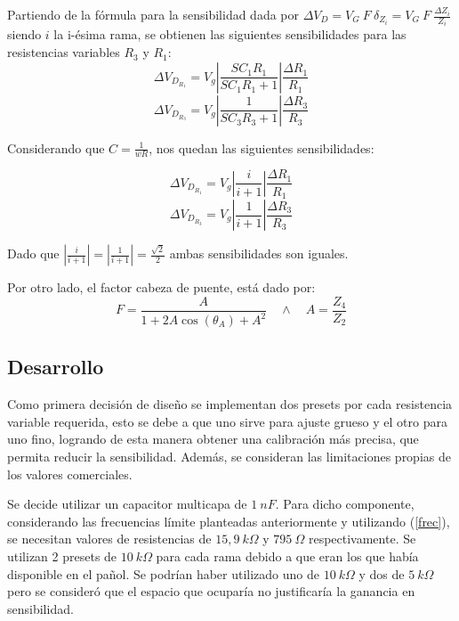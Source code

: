 Partiendo de la fórmula para la sensibilidad dada por $\Delta V_D=V_G \ F \ \delta_{Z_i}=V_G \ F \ \frac{\Delta Z_i}{Z_i}$ siendo $i$ la i-ésima rama, se obtienen las siguientes sensibilidades para las resistencias variables $R_3$ y $R_1$:
\begin{equation}
\Delta V_{D_{R_1}}=V_g\left|\frac{SC_1R_1}{SC_1R_1+1}\right|\frac{\Delta R_1}{R_1}
\end{equation}
\begin{equation}
\Delta V_{D_{R_3}}=V_g\left|\frac{1}{SC_3R_3+1}\right|\frac{\Delta R_3}{R_3}
\end{equation}

Considerando que $C=\frac{1}{wR}$, nos quedan las siguientes sensibilidades:

\begin{equation}
\Delta V_{D_{R_1}}=V_g\left|\frac{i}{i+1}\right|\frac{\Delta R_1}{R_1}
\label{VDR_1}
\end{equation}
\begin{equation}
\Delta V_{D_{R_3}}=V_g\left|\frac{1}{i+1}\right|\frac{\Delta R_3}{R_3}
\label{VDR_3}
\end{equation}

Dado que $\left|\frac{i}{i+1}\right|=\left|\frac{1}{i+1}\right|=\frac{\sqrt{2}}{2}$ ambas sensibilidades son iguales.


Por otro lado, el factor cabeza de puente, está dado por:
\begin{equation}
F=\frac{A}{1+2A\cos(\theta_A)+A^2} \quad \wedge \quad A=\frac{Z_4}{Z_2}
\label{cabeza_de_puente}
\end{equation} 

\subsection{Desarrollo}

Como primera decisión de diseño se implementan dos presets por cada resistencia variable requerida, esto se debe a que uno sirve para ajuste grueso y el otro para uno fino, logrando de esta manera obtener una calibración más precisa, que permita reducir la sensibilidad. Además, se consideran las limitaciones propias de los valores comerciales.

Se decide utilizar un capacitor multicapa de $1 \ nF$. Para dicho componente, considerando las frecuencias límite planteadas anteriormente y utilizando (\ref{frec}), se necesitan valores de resistencias de $15,9 \ k\Omega$ y $795 \ \Omega$ respectivamente. Se utilizan 2 presets de $10 \ k\Omega$ para cada rama debido a que eran los que había disponible en el pañol. Se podrían haber utilizado uno de $10 \ k\Omega$ y dos de $5 \ k\Omega$ pero se consideró que el espacio que ocuparía no justificaría la ganancia en sensibilidad.

